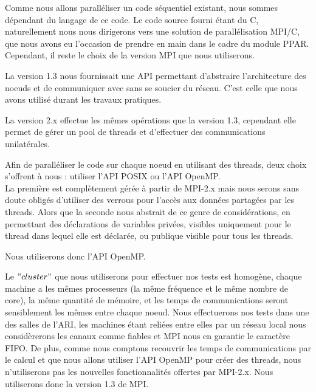 \par Comme nous allons paralléliser un code séquentiel existant,
nous sommes dépendant du langage de ce code. Le code source fourni 
étant du C, naturellement nous nous dirigerons vers une solution 
de parallélisation MPI/C, que nous avons eu l'occasion de prendre 
en main dans le cadre du module PPAR. Cependant, il reste le choix de la 
version MPI que nous utiliserons.\\

\par La version 1.3 nous fournissait une API permettant d'abstraire 
l'architecture des noeuds et de communiquer avec sans se soucier du réseau. C'est
celle que nous avons utilisé durant les travaux pratiques.\\

\par La version 2.x effectue les mêmes opérations que la version 1.3,
cependant elle permet de gérer un pool de threads et d'effectuer des communications unilatérales.\\

\par Afin de paralléliser le code sur chaque noeud en utilisant des threads,
deux choix s'offrent à nous : utiliser l'API POSIX ou l'API OpenMP.\\
La première est complètement gérée à partir de MPI-2.x mais nous serons sans doute
obligés d'utiliser des verrous pour l'accès aux données partagées par les threads.
Alors que la seconde nous abstrait de ce genre de considérations, en permettant 
des déclarations de variables privées, visibles uniquement pour le thread dans lequel elle est déclarée, 
ou publique visible pour tous les threads.\\

\par Nous utiliserons donc l'API OpenMP.\\

\par Le $"cluster"$ que nous utiliserons pour effectuer nos tests 
est homogène, chaque machine a les mêmes processeurs (la même fréquence et le même nombre de core),
la même quantité de mémoire, et les temps de communications seront sensiblement 
les mêmes entre chaque noeud. Nous effectuerons nos tests dans une des salles 
de l'ARI, les machines étant reliées entre elles par un réseau local nous considèrerons 
les canaux comme fiables et MPI nous en garantie le caractère FIFO.
De plus, comme nous comptons recouvrir les temps
de communications par le calcul et que nous allons utiliser l'API OpenMP 
pour créer des threads, nous n'utiliserons pas les nouvelles fonctionnalités offertes
par MPI-2.x. Nous utiliserons donc la version 1.3 de MPI.\\

